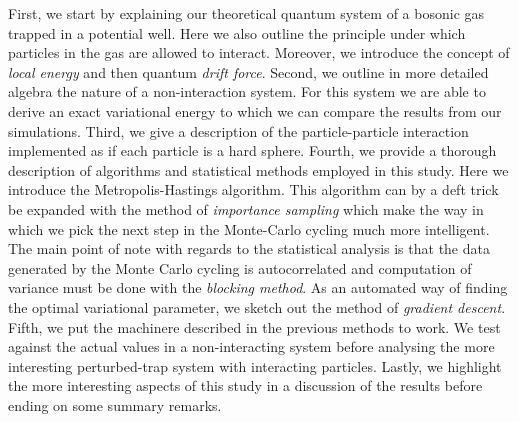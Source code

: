\documentclass[
    a4paper, aps, twocolumn, floatfix, superscriptaddress, nofootinbib]{revtex4-1}
\newcommand{\1}{\mathds{1}}
\begin{document}
    First, we start by explaining our theoretical quantum system of a bosonic gas trapped
    in a potential well. Here we also outline the principle under which particles in the gas are
    allowed to interact. Moreover, we introduce the concept of \emph{local energy} and
    then quantum \emph{drift force}. Second, we outline in more detailed algebra the
    nature of a non-interaction system. For this system we are able to derive an exact
    variational energy to which we can compare the results from our simulations. Third,
    we give a description of the particle-particle interaction implemented as if each
    particle is a hard sphere. Fourth, we provide a thorough description of algorithms and
    statistical methods employed in this study. Here we introduce the Metropolis-Hastings
    algorithm. This algorithm can by a deft trick be expanded with the method of
    \emph{importance sampling} which make the way in which we pick the next step in
       the Monte-Carlo cycling much more intelligent. The main point of note with regards to
       the statistical analysis is that the data generated by the Monte Carlo cycling is
       autocorrelated and computation of variance must be done with the \emph{blocking method}.
       As an automated way of finding the optimal variational parameter, we sketch out the
       method of \emph{gradient descent}. Fifth, we put the machinere described in the
       previous methods to work. We test against the actual values in a non-interacting system
       before analysing the more interesting perturbed-trap system with interacting particles.
       Lastly, we highlight the more interesting aspects of this study in a discussion of the results
       before ending on some summary remarks.
\end{document}
